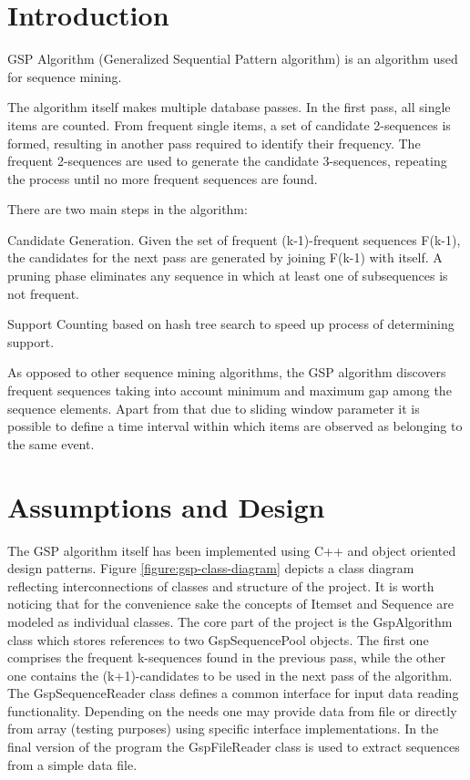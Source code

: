 \documentclass[journal,a4paper]{IEEEtran}
\newenvironment{my_itemize}{
\begin{itemize}
  \setlength{\itemsep}{4pt}
  \setlength{\parskip}{1pt}
  \setlength{\parsep}{4pt}}
{\end{itemize}
}
\begin{document}
\section{Introduction}

GSP\cite{gsp} Algorithm (Generalized Sequential Pattern algorithm) is an algorithm used for sequence mining.

The algorithm itself makes multiple database passes. In the first pass, all single items are counted. From frequent single items, a set of candidate 2-sequences is formed, resulting in another pass required to identify their frequency. The frequent 2-sequences are used to generate the candidate 3-sequences, repeating the process until no more frequent sequences are found.

There are two main steps in the algorithm:

\begin{my_itemize}
\item Candidate Generation. Given the set of frequent (k-1)-frequent sequences F(k-1), the candidates for the next pass are generated by joining F(k-1) with itself. A pruning phase eliminates any sequence in which at least one of subsequences is not frequent.
\item Support Counting based on hash tree search to speed up process of determining support.
\end{my_itemize}

As opposed to other sequence mining algorithms, the GSP algorithm discovers frequent sequences taking into account minimum and maximum gap among the sequence elements. Apart from that due to sliding window parameter it is possible to define a time interval within which items are observed as belonging to the same event.

\section{Assumptions and Design}

The GSP algorithm itself has been implemented using C++ and object oriented design patterns. Figure \ref{figure:gsp-class-diagram} depicts a class diagram reflecting interconnections of classes and structure of the project. It is worth noticing that for the convenience sake the concepts of Itemset and Sequence are modeled as individual classes. The core part of the project is the GspAlgorithm class which stores references to two GspSequencePool objects. The first one comprises the frequent k-sequences found in the previous pass, while the other one contains the (k+1)-candidates to be used in the next pass of the algorithm. The GspSequenceReader class defines a common interface for input data reading functionality. Depending on the needs one may provide data from file or directly from array (testing purposes) using specific interface implementations. In the final version of the program the GspFileReader class is used to extract sequences from a simple data file.
\end{document}
